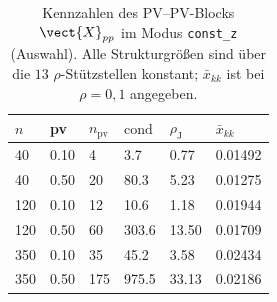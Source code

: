 \begin{table}[htbp]
\centering
\caption{Kennzahlen des PV--PV-Blocks $\vect{X}_{pp}$ im Modus \texttt{const\_z} (Auswahl). Alle Strukturgr\"o\ss en sind \"uber die $13$ $\rho$-St\"utzstellen konstant; $\bar{x}_{kk}$ ist bei $\rho=0{,}1$ angegeben.}
\label{tab:rx-outer-struct}
\begin{tabular}{llllll}
\toprule
$n$ & pv & $n_\mathrm{pv}$ & $\mathrm{cond}$ & $\rho_{\mathrm{J}}$ & $\bar{x}_{kk}$ \\
\midrule
40 & 0.10 & 4 & 3.7 & 0.77 & 0.01492 \\
40 & 0.50 & 20 & 80.3 & 5.23 & 0.01275 \\
120 & 0.10 & 12 & 10.6 & 1.18 & 0.01944 \\
120 & 0.50 & 60 & 303.6 & 13.50 & 0.01709 \\
350 & 0.10 & 35 & 45.2 & 3.58 & 0.02434 \\
350 & 0.50 & 175 & 975.5 & 33.13 & 0.02186 \\
\bottomrule
\end{tabular}
\end{table}
